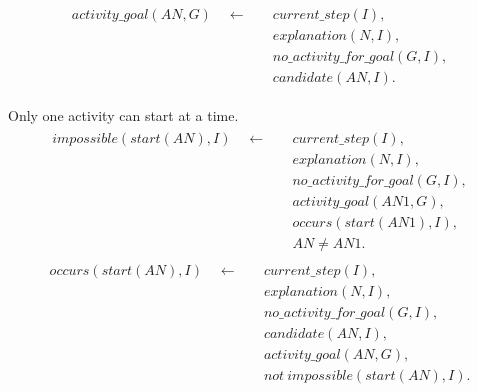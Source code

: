 \documentclass[11pt, oneside]{article}
\begin{document}
\begin{align}\begin{split}
activity\_goal(AN,G) \quad \leftarrow \quad &current\_step(I),\\
&explanation(N,I),\\
&no\_activity\_for\_goal(G,I),\\
&candidate(AN,I).
\end{split}\end{align}

Only one activity can start at a time.
\begin{align}\begin{split}
impossible(start(AN),I) \quad \leftarrow \quad &current\_step(I),\\
&explanation(N,I),\\
&no\_activity\_for\_goal(G,I),\\
&activity\_goal(AN1,G),\\
&occurs(start(AN1),I),\\
&AN\neq AN1.
\end{split}\end{align}
\begin{align}\begin{split}
occurs(start(AN),I) \quad \leftarrow \quad &current\_step(I),\\
&explanation(N,I),\\
&no\_activity\_for\_goal(G,I),\\
&candidate(AN,I),\\
&activity\_goal(AN,G),\\
&not\ impossible(start(AN),I).
\end{split}\end{align}
\end{document}
